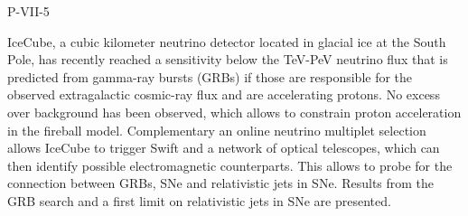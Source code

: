 P-VII-5


\bigskip



\bigskip

\noindent IceCube, a cubic kilometer neutrino detector located in glacial ice at the South Pole, has recently reached a sensitivity below the TeV-PeV neutrino flux that is predicted from gamma-ray bursts (GRBs) if those are responsible for the observed extragalactic cosmic-ray flux and are accelerating protons. No excess over background has been observed, which allows to constrain proton acceleration in the fireball model. Complementary an online neutrino multiplet selection allows IceCube to trigger Swift and a network of optical telescopes, which can then identify possible electromagnetic counterparts. This allows to probe for the connection between GRBs, SNe and relativistic jets in SNe. Results from the GRB search and a first limit on relativistic jets in SNe are presented.

